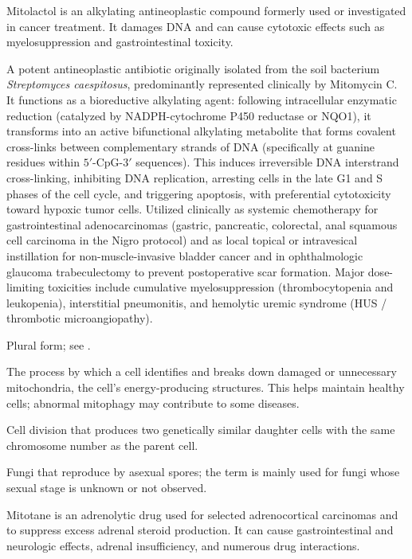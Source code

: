  Mitolactol is an alkylating antineoplastic compound formerly used or investigated in cancer treatment. It damages DNA and can cause cytotoxic effects such as myelosuppression and gastrointestinal toxicity.

 A potent antineoplastic antibiotic originally isolated from the soil bacterium \textit{Streptomyces caespitosus}, predominantly represented clinically by Mitomycin C. It functions as a bioreductive alkylating agent: following intracellular enzymatic reduction (catalyzed by NADPH-cytochrome P450 reductase or NQO1), it transforms into an active bifunctional alkylating metabolite that forms covalent cross-links between complementary strands of DNA (specifically at guanine residues within $5'\text{-CpG-}3'$ sequences). This induces irreversible DNA interstrand cross-linking, inhibiting DNA replication, arresting cells in the late G1 and S phases of the cell cycle, and triggering apoptosis, with preferential cytotoxicity toward hypoxic tumor cells. Utilized clinically as systemic chemotherapy for gastrointestinal adenocarcinomas (gastric, pancreatic, colorectal, anal squamous cell carcinoma in the Nigro protocol) and as local topical or intravesical instillation for non-muscle-invasive bladder cancer and in ophthalmologic glaucoma trabeculectomy to prevent postoperative scar formation. Major dose-limiting toxicities include cumulative myelosuppression (thrombocytopenia and leukopenia), interstitial pneumonitis, and hemolytic uremic syndrome (HUS / thrombotic microangiopathy).

 Plural form; see .

 The process by which a cell identifies and breaks down damaged or unnecessary mitochondria, the cell's energy-producing structures. This helps maintain healthy cells; abnormal mitophagy may contribute to some diseases.

 Cell division that produces two genetically similar daughter cells with the same chromosome number as the parent
cell.

 Fungi that reproduce by asexual spores; the term is mainly used for fungi whose sexual stage is unknown or not observed.

 Mitotane is an adrenolytic drug used for selected adrenocortical carcinomas and to suppress excess adrenal steroid production. It can cause gastrointestinal and neurologic effects, adrenal insufficiency, and numerous drug interactions.

